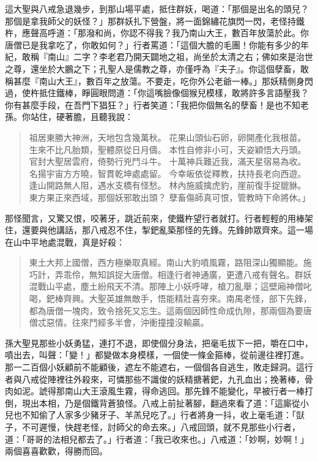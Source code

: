 這大聖與八戒急退幾步，到那山場平處，抵住群妖，喝道：「那個是出名的頭兒？那個是拿我師父的妖怪？」那群妖扎下營盤，將一面錦繡花旗閃一閃，老怪持鐵杵，應聲高呼道：「那潑和尚，你認不得我？我乃南山大王，數百年放蕩於此。你唐僧已是我拿吃了，你敢如何？」行者罵道：「這個大膽的毛團！你能有多少的年紀，敢稱『南山』二字？李老君乃開天闢地之祖，尚坐於太清之右；佛如來是治世之尊，還坐於大鵬之下；孔聖人是儒教之尊，亦僅呼為『夫子』。你這個孽畜，敢稱甚麼『南山大王』，數百年之放蕩。不要走，吃你外公老爺一棒。」那妖精側身閃過，使杵抵住鐵棒，睜圓眼問道：「你這嘴臉像個猴兒模樣，敢將許多言語壓我？你有甚麼手段，在吾門下猖狂？」行者笑道：「我把你個無名的孽畜！是也不知老孫。你站住，硬著膽，且聽我說：
\begin{quote}
祖居東勝大神洲，天地包含幾萬秋。
花果山頭仙石卵，卵開產化我根苗。
生來不比凡胎類，聖體原從日月儔。
本性自修非小可，天姿穎悟大丹頭。
官封大聖居雲府，倚勢行兇鬥斗牛。
十萬神兵難近我，滿天星宿易為收。
名揚宇宙方方曉，智貫乾坤處處留。
今幸皈依從釋教，扶持長老向西遊。
逢山開路無人阻，遇水支橋有怪愁。
林內施威擒虎豹，崖前復手捉貔貅。
東方果正來西域，那個妖邪敢出頭？
孽畜傷師真可恨，管教時下命將休。」
\end{quote}

那怪聞言，又驚又恨，咬著牙，跳近前來，使鐵杵望行者就打。行者輕輕的用棒架住，還要與他講話，那八戒忍不住，掣鈀亂築那怪的先鋒。先鋒帥眾齊來。這一場在山中平地處混戰，真是好殺：
\begin{quote}
東土大邦上國僧，西方極樂取真經。南山大豹噴風霧，路阻深山獨顯能。施巧計，弄乖伶，無知誤捉大唐僧。相逢行者神通廣，更遭八戒有聲名。群妖混戰山平處，塵土紛飛天不清。那陣上小妖呼哮，槍刀亂舉；這壁廂神僧叱喝，鈀棒齊興。大聖英雄無敵手，悟能精壯喜夯來。南禺老怪，部下先鋒，都為唐僧一塊肉，致令捨死又忘生。這兩個因師性命成仇隙，那兩個為要唐僧忒惡情。往來鬥經多半會，沖衝撞撞沒輸贏。
\end{quote}

孫大聖見那些小妖勇猛，連打不退，即使個分身法，把毫毛拔下一把，嚼在口中，噴出去，叫聲：「變！」都變做本身模樣，一個使一條金箍棒，從前邊往裡打進。那一二百個小妖顧前不能顧後，遮左不能遮右，一個個各自逃生，敗走歸洞。這行者與八戒從陣裡往外殺來，可憐那些不識俊的妖精搪著鈀，九孔血出；挽著棒，骨肉如泥。諕得那南山大王滾風生霧，得命逃回。那先鋒不能變化，早被行者一棒打倒，現出本相，乃是個鐵背蒼狼怪。八戒上前扯著腳，翻過來看了道：「這廝從小兒也不知偷了人家多少豬牙子、羊羔兒吃了。」行者將身一抖，收上毫毛道：「獃子，不可遲慢，快趕老怪，討師父的命去來。」八戒回頭，就不見那些小行者，道：「哥哥的法相兒都去了。」行者道：「我已收來也。」八戒道：「妙啊，妙啊！」兩個喜喜歡歡，得勝而回。

